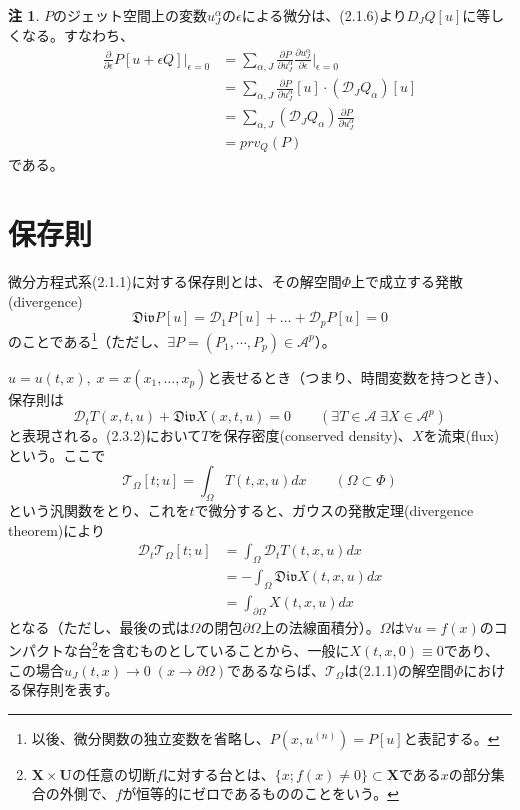 \documentclass[a4paper, 11pt]{report}
\theoremstyle{definition}
\newtheorem*{remark*}{注}
\begin{document}
\begin{remark*}
 $P$のジェット空間上の変数$u^\alpha_J$の$\epsilon$による微分は、(2.1.6)より$D_JQ[u]$に等しくなる。すなわち、
\begin{align*}
\frac{\partial}{\partial \epsilon}P[u+\epsilon Q]|_{\epsilon = 0} &= \sum_{\alpha ,J}\frac{\partial P}{\partial u_J^\alpha}\frac{\partial  u_J^\alpha}{\partial \epsilon}|_{\epsilon = 0}\\
&= \sum_{\alpha ,J}\frac{\partial P}{\partial u_J^\alpha}[u] \cdot (\mathcal{D}_JQ_\alpha)[u]\\
&= \sum_{\alpha ,J}(\mathcal{D}_JQ_\alpha)\frac{\partial P}{\partial u_J^\alpha}\\
&= prv_Q(P)
\end{align*}
である。
\end{remark*}

\section{保存則}

 微分方程式系(2.1.1)に対する保存則とは、その解空間$\Phi$上で成立する発散(divergence)
\begin{equation}
\mathfrak{Div}P[u] = \mathcal{D}_1P[u]+ \dots +\mathcal{D}_pP[u] = 0 %
\end{equation}
のことである\footnote{以後、微分関数の独立変数を省略し、$P(x,u^{(n)})=P[u]$と表記する。}（ただし、$\exists P=(P_1,\cdots,P_p)\in \mathcal{A}^p$）。

 $u=u(t,x),\; x=x(x_1,\dots,x_p)$と表せるとき（つまり、時間変数を持つとき）、保存則は
\begin{equation}
\mathcal{D}_tT(x,t,u) + \mathfrak{Div}X(x,t,u) = 0\qquad (\exists T\in \mathcal{A}\; \exists X\in \mathcal{A}^p) %
\end{equation}
と表現される。(2.3.2)において$T$を保存密度(conserved density)、$X$を流束(flux)という。ここで
\begin{equation}
\mathcal{T}_\Omega[t;u] = \int _\Omega T(t,x,u)dx\qquad (\Omega\subset \Phi) %
\end{equation}
という汎関数をとり、これを$t$で微分すると、ガウスの発散定理(divergence theorem)により
\begin{align*}
\mathcal{D}_t\mathcal{T}_\Omega[t;u] &= \int _\Omega \mathcal{D}_tT(t,x,u)dx \\
&= -\int _\Omega \mathfrak{Div}X(t,x,u)dx \\
&= \int _{\partial \Omega }X(t,x,u)dx
\end{align*}
となる（ただし、最後の式は$\Omega$の閉包$\partial \Omega$上の法線面積分）。$\Omega$は$\forall u=f(x)$のコンパクトな台\footnote{$\mathbf{X}\times \mathbf{U}$の任意の切断$f$に対する台とは、$\{ x;f(x)\neq 0 \}\subset \mathbf{X}$である$x$の部分集合の外側で、$f$が恒等的にゼロであるもののことをいう。}を含むものとしていることから、一般に$X(t,x,0)\equiv 0$であり、この場合$u_J(t,x)\rightarrow 0\; (x\rightarrow \partial \Omega)$であるならば、$\mathcal{T}_\Omega$は(2.1.1)の解空間$\Phi$における保存則を表す。
\end{document}
